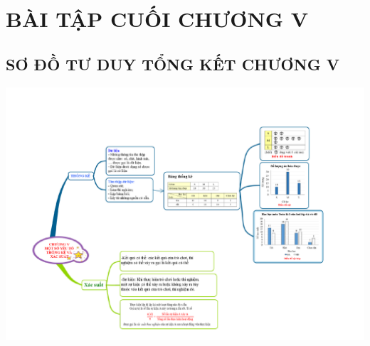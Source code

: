 \def\i{\item}
\graphicspath{{../pictures/c5/}}
\newpage
\section{BÀI TẬP CUỐI CHƯƠNG V}
\subsection{SƠ ĐỒ TƯ DUY TỔNG KẾT CHƯƠNG V}
\begin{center}
	\includegraphics[width=1\linewidth]{doc1.pdf}
\end{center}
